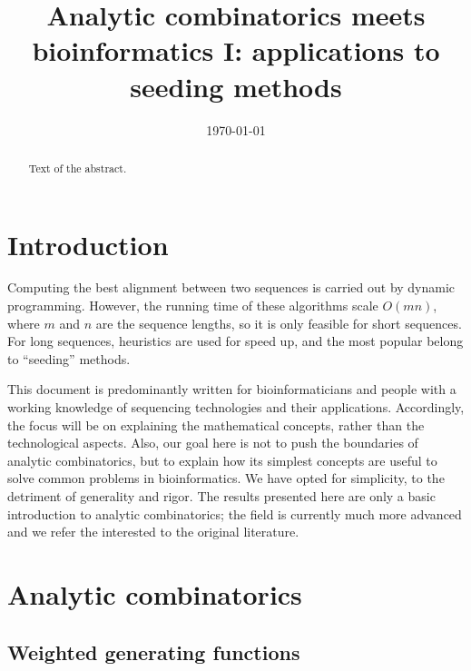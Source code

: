 \documentclass{article}
\title{Analytic combinatorics meets bioinformatics I: applications to
seeding methods}
\date{\today}
\begin{document}
\maketitle

\begin{abstract}
Text of the abstract.
\end{abstract}



\section{Introduction}

Computing the best alignment between two sequences is carried out by
dynamic programming. However, the running time of these algorithms scale
$O(mn)$, where $m$ and $n$ are the sequence lengths, so it is only
feasible for short sequences. For long sequences, heuristics are used for
speed up, and the most popular belong to ``seeding'' methods.

This document is predominantly written for bioinformaticians and people
with a working knowledge of sequencing technologies and their applications.
Accordingly, the focus will be on explaining the mathematical concepts,
rather than the technological aspects. Also, our goal here is not to push
the boundaries of analytic combinatorics, but to explain how its simplest
concepts are useful to solve common problems in bioinformatics. We have
opted for simplicity, to the detriment of generality and rigor. The
results presented here are only a basic introduction to analytic
combinatorics; the field is currently much more advanced and we refer the
interested to the original literature.

\section{Analytic combinatorics}
\subsection{Weighted generating functions}
\label{subsec:WGF}
\end{document}
